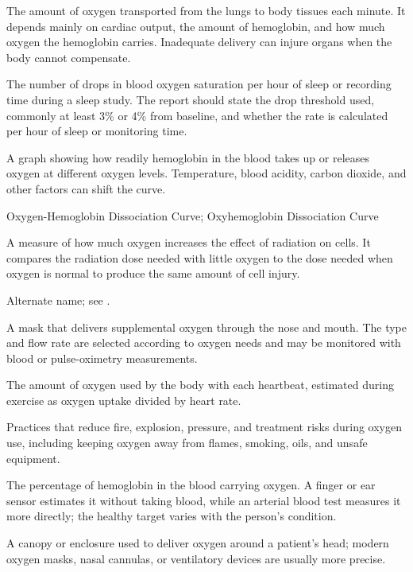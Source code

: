  The amount of oxygen transported from the lungs to body tissues each minute. It depends mainly on cardiac output, the amount of hemoglobin, and how much oxygen the hemoglobin carries. Inadequate delivery can injure organs when the body cannot compensate.

 The number of drops in blood oxygen saturation per hour of sleep or recording time during a sleep study. The report should state the drop threshold used, commonly at least 3\% or 4\% from baseline, and whether the rate is calculated per hour of sleep or monitoring time.

 A graph showing how readily hemoglobin in the blood takes up or releases oxygen at different oxygen levels. Temperature, blood acidity, carbon dioxide, and other factors can shift the curve.

\synonyms
Oxygen-Hemoglobin Dissociation Curve; Oxyhemoglobin Dissociation Curve

 A measure of how much oxygen increases the effect of radiation on cells. It compares the radiation dose needed with little oxygen to the dose needed when oxygen is normal to produce the same amount of cell injury.

 Alternate name; see .

 A mask that delivers supplemental oxygen through the nose and mouth. The type and flow rate are selected according to oxygen needs and may be monitored with blood or pulse-oximetry measurements.

 The amount of oxygen used by the body with each heartbeat, estimated during exercise as oxygen uptake divided by heart rate.

 Practices that reduce fire, explosion, pressure, and treatment risks during oxygen use, including keeping oxygen away from flames, smoking, oils, and unsafe equipment.

 The percentage of hemoglobin in the blood carrying oxygen. A finger or ear sensor estimates it without taking blood, while an arterial blood test measures it more directly; the healthy target varies with the person’s condition.

 A canopy or enclosure used to deliver oxygen around a patient’s head; modern oxygen masks, nasal cannulas, or ventilatory devices are usually more precise.

